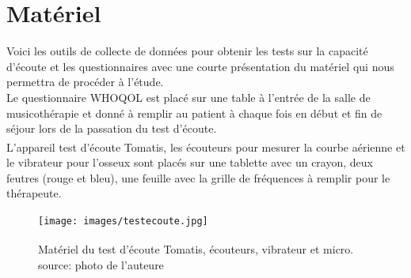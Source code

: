 


\section{Matériel}
Voici les outils de collecte de données pour obtenir les tests sur la capacité d'écoute  et les 
questionnaires 
avec une courte présentation du matériel qui nous permettra de procéder à l'étude. 
\\
Le questionnaire 
WHOQOL est placé sur une table à l'entrée de la salle de musicothérapie 
et donné à remplir au patient à chaque fois  en début et fin de séjour lors de la passation du test 
d'écoute. 
\\ 
	 L'appareil
	test d'écoute Tomatis\textsuperscript \textregistered , les écouteurs pour mesurer la courbe  aérienne 
	et le vibrateur pour l'osseux sont placés sur une tablette avec  un crayon, 
	deux
	feutres (rouge et bleu), une feuille avec la grille de fréquences à
	remplir pour le thérapeute.
\begin{figure}
	\centering
	\texttt{[image: images/testecoute.jpg]}
	\caption[Appareil test écoute Tomatis ]{Matériel du test d'écoute Tomatis\textsuperscript 
	\textregistered , écouteurs, vibrateur et micro. 
	source:  photo 
	de 
	l'auteure}
	
	\label{appareiltestecoute}
\end{figure}

